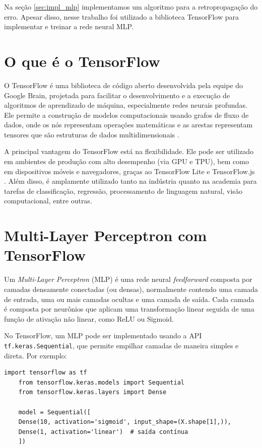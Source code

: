 \documentclass[12pt,a4paper,oneside]{report}
\begin{document}
Na seção \ref{sec:impl_mlp} implementamos um algoritmo para a retropropagação do erro. Apesar disso, nesse trabalho foi utilizado a biblioteca TensorFlow para implementar e treinar a rede neural MLP.

\section{O que é o TensorFlow}

O TensorFlow é uma biblioteca de código aberto desenvolvida pela equipe do Google Brain, projetada para facilitar o desenvolvimento e a execução de algoritmos de aprendizado de máquina, especialmente redes neurais profundas. Ele permite a construção de modelos computacionais usando grafos de fluxo de dados, onde os nós representam operações matemáticas e as arestas representam tensores que são estruturas de dados multidimensionais \cite{wikipedia:2022}.

A principal vantagem do TensorFlow está na flexibilidade. Ele pode ser utilizado em ambientes de produção com alto desempenho (via GPU e TPU), bem como em dispositivos móveis e navegadores, graças ao TensorFlow Lite e TensorFlow.js \cite{didatica:2024}. Além disso, é amplamente utilizado tanto na indústria quanto na academia para tarefas de classificação, regressão, processamento de linguagem natural, visão computacional, entre outras.

\section{Multi-Layer Perceptron com TensorFlow}
\label{sec:mpl_tf}
Um \textit{Multi-Layer Perceptron} (MLP) é uma rede neural \textit{feedforward} composta por camadas densamente conectadas (ou densas), normalmente contendo uma camada de entrada, uma ou mais camadas ocultas e uma camada de saída. Cada camada é composta por neurônios que aplicam uma transformação linear seguida de uma função de ativação não linear, como ReLU ou Sigmoid.

No TensorFlow, um MLP pode ser implementado usando a API \texttt{tf.keras.Sequential}, que permite empilhar camadas de maneira simples e direta. Por exemplo:
\begin{lstlisting}[caption={implementação MLP no tensorflow}, label={lst:impl_tf}]
	import tensorflow as tf
	from tensorflow.keras.models import Sequential
	from tensorflow.keras.layers import Dense
	
	model = Sequential([
	Dense(10, activation='sigmoid', input_shape=(X.shape[1],)),
	Dense(1, activation='linear')  # saída contínua
	])
\end{lstlisting}
\end{document}
